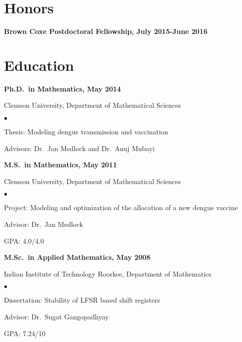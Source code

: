 \documentclass[margin,line,pifont,palatino,courier]{res}
\newenvironment{list1}{
  \begin{list}{\ding{113}}{%
      \setlength{\itemsep}{0in}
      \setlength{\parsep}{0in} \setlength{\parskip}{0in}
      \setlength{\topsep}{0in} \setlength{\partopsep}{0in}
      \setlength{\leftmargin}{0.17in}}}{\end{list}}
\newenvironment{list2}{
  \begin{list}{$\bullet$}{%
      \setlength{\itemsep}{0in}
      \setlength{\parsep}{0in} \setlength{\parskip}{0in}
      \setlength{\topsep}{0in} \setlength{\partopsep}{0in}
      \setlength{\leftmargin}{0.2in}}}{\end{list}}
\begin{document}
\begin{resume}
\section{\sc Honors}
\textbf{Brown Coxe Postdoctoral Fellowship, July 2015-June 2016 }

\section{\sc Education}

{\bf Ph.D.~in Mathematics, May 2014}\\
\vspace*{-.1in}
\begin{list1}
\item[] Clemson University, Department of Mathematical Sciences

\begin{list2}
\vspace*{.05in}
\item Thesis:  Modeling dengue transmission and vaccination
\item Advisors: Dr.~Jan Medlock and Dr.~Anuj Mubayi
\end{list2}
\end{list1}

{\bf M.S.~in Mathematics, May 2011}\\
\vspace*{-.1in}
\begin{list1}
\item[] Clemson University, Department of Mathematical Sciences
\begin{list2}
\vspace*{.05in}
\item Project:  Modeling and optimization of the allocation of a new dengue vaccine
\item Advisor: Dr.~Jan Medlock
\item GPA: 4.0/4.0
\end{list2}
\end{list1}

{\bf  M.Sc.~in Applied Mathematics, May 2008} \\
\vspace*{-.1in}
\begin{list1}
\item[] Indian Institute of Technology Roorkee, Department of Mathematics

\begin{list2}
\vspace*{.05in}
\item Dissertation:  Stability of LFSR based shift registers
\item Advisor: Dr.~Sugat Gangopadhyay
\item GPA: 7.24/10
\end{list2}


\end{list1}
\end{resume}
\end{document}
